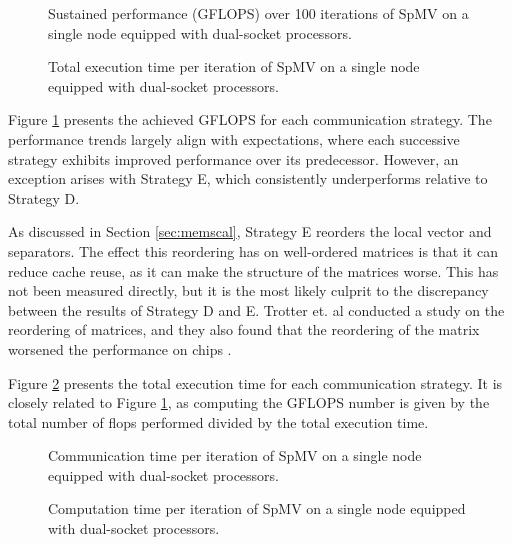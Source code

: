 \begin{figure}[H]
    \centering
    \caption{Sustained performance (GFLOPS) over 100 iterations of SpMV on a single node equipped with dual-socket  processors.}
    \label{fig:gflopsdefqsingle}
\end{figure}

\begin{figure}[H]
    \centering
    \caption{Total execution time per iteration of SpMV on a single node equipped with dual-socket  processors.}
    \label{fig:tdefqsingle}
\end{figure}

Figure \ref{fig:gflopsdefqsingle} presents the achieved GFLOPS for each communication strategy. The performance trends largely align with expectations, where each successive strategy exhibits improved performance over its predecessor. However, an exception arises with Strategy E, which consistently underperforms relative to Strategy D.
\medskip

As discussed in Section \ref{sec:memscal}, Strategy E reorders the local vector and separators. The effect this reordering has on well-ordered matrices is that it can reduce cache reuse, as it can make the structure of the matrices worse. This has not been measured directly, but it is the most likely culprit to the discrepancy between the results of Strategy D and E. Trotter et. al conducted a study on the reordering of matrices, and they also found that the reordering of the matrix worsened the performance on  chips \cite{ordersparse}.
\medskip

Figure \ref{fig:tdefqsingle} presents the total execution time for each communication strategy. It is closely related to Figure \ref{fig:gflopsdefqsingle}, as computing the GFLOPS number is given by the total number of flops performed divided by the total execution time.



\begin{figure}[H]
    \centering
    \caption{Communication time per iteration of SpMV on a single node equipped with dual-socket  processors.}
    \label{fig:tcommdefqsingle}
\end{figure}

\begin{figure}[H]
    \centering
    \caption{Computation time per iteration of SpMV on a single node equipped with dual-socket  processors.}
    \label{fig:tcompdefqsingle}
\end{figure}

